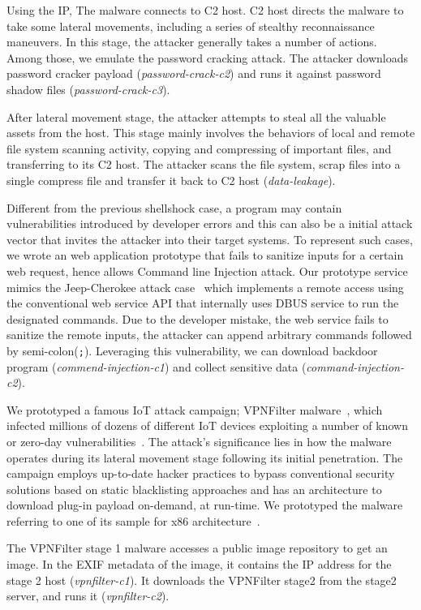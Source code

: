 Using the IP, The malware connects to C2 host. C2 host directs the malware to take
some lateral movements, including a series of stealthy reconnaissance maneuvers. 
In this stage, the attacker generally takes a number of actions. Among those, we emulate the password cracking attack. The attacker downloads password cracker payload (\emph{password-crack-c2}) and runs it against password shadow files (\emph{password-crack-c3}).

After lateral movement stage, the attacker attempts to steal all the valuable assets from the host. 
This stage mainly involves the behaviors of local and remote file system scanning activity, copying and compressing of important files, and transferring to its C2 host.
The attacker scans the file system, scrap files into a single compress file and transfer it back to C2 host (\emph{data-leakage}).

Different from the previous shellshock case, a program may contain vulnerabilities introduced by developer errors and this can also be a initial attack vector that invites the attacker into their target systems. To represent
such cases, we wrote an web application prototype that fails to sanitize inputs for a certain web request, hence allows Command line Injection attack. 
Our prototype service mimics the Jeep-Cherokee attack case~\cite{miller:remote:2015} which implements a remote access using the conventional web service API that
internally uses DBUS service to run the designated commands. 
Due to the developer mistake, the web service fails to sanitize the remote inputs, the attacker can append arbitrary commands followed by semi-colon({\tt;}). 
Leveraging this vulnerability, we can download backdoor program (\emph{commend-injection-c1}) and collect sensitive data (\emph{command-injection-c2}).

We prototyped a famous IoT attack campaign; VPNFilter malware~\cite{vpnfilterschenier}, which infected millions of dozens of different IoT devices exploiting a number of
known or zero-day vulnerabilities~\cite{vpnfilter1,vpnfilter2}. The attack's
significance lies in how the malware operates during its lateral movement stage following its initial penetration. 
The campaign employs up-to-date hacker practices to bypass conventional security solutions based on static blacklisting approaches and has an architecture to download plug-in payload on-demand, at run-time. 
We prototyped the malware referring to one of its sample for x86 architecture~\cite{vpnfilterx86}. 

The VPNFilter stage 1 malware accesses a public image repository to get an image. In the EXIF metadata of the image, it contains the IP address for the stage 2 host (\emph{vpnfilter-c1}). It downloads the VPNFilter stage2 from the stage2 server, and runs it (\emph{vpnfilter-c2}).


